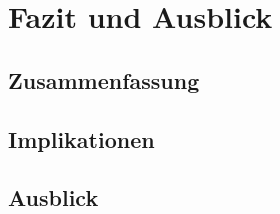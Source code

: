 \chapter{Fazit und Ausblick}\label{chap:fazit}

\section{Zusammenfassung}\label{sec:zusammenfassung}

\section{Implikationen}\label{sec:implikationen}

\section{Ausblick}\label{sec:ausblick}
